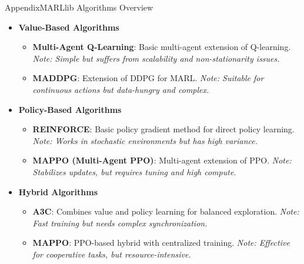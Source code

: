 \begin{frame}[allowframebreaks]{Appendix}{MARLlib Algorithms Overview}

    \begin{itemize}
        \item \textbf{Value-Based Algorithms}
              \begin{itemize}
                  \item \textbf{Multi-Agent Q-Learning}: Basic multi-agent extension of Q-learning.\newline
                        \textit{Note: Simple but suffers from scalability and non-stationarity issues.}
                  \item \textbf{MADDPG}: Extension of DDPG for MARL.\newline
                        \textit{Note: Suitable for continuous actions but data-hungry and complex.}
              \end{itemize}

        \item \textbf{Policy-Based Algorithms}
              \begin{itemize}
                  \item \textbf{REINFORCE}: Basic policy gradient method for direct policy learning.\newline
                        \textit{Note: Works in stochastic environments but has high variance.}
                  \item \textbf{MAPPO (Multi-Agent PPO)}: Multi-agent extension of PPO.\newline
                        \textit{Note: Stabilizes updates, but requires tuning and high compute.}
              \end{itemize}

        \item \textbf{Hybrid Algorithms}
              \begin{itemize}
                  \item \textbf{A3C}: Combines value and policy learning for balanced exploration.\newline
                        \textit{Note: Fast training but needs complex synchronization.}
                  \item \textbf{MAPPO}: PPO-based hybrid with centralized training.\newline
                        \textit{Note: Effective for cooperative tasks, but resource-intensive.}
              \end{itemize}


\end{itemize}
\end{frame}
